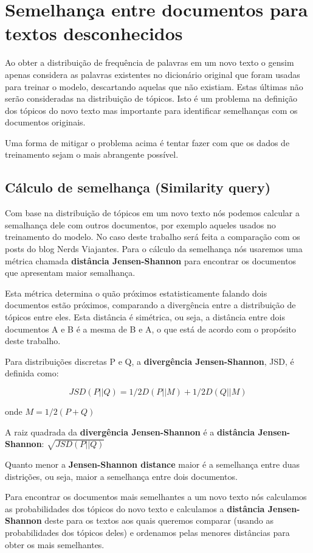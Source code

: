 \section{Semelhança entre documentos para textos desconhecidos}

Ao obter a distribuição de frequência de palavras em um novo texto o gensim apenas considera as palavras existentes no dicionário original que foram usadas para 
treinar o modelo, descartando aquelas que não existiam. Estas últimas não serão consideradas na distribuição de tópicos. Isto é um problema na definição dos tópicos
do novo texto mas importante para identificar semelhanças com os documentos originais.

Uma forma de mitigar o problema acima é tentar fazer com que os dados de treinamento sejam o mais abrangente possível.

\subsection{Cálculo de semelhança (Similarity query)}

Com base na distribuição de tópicos em um novo texto nós podemos calcular a semalhança dele com outros documentos, por exemplo aqueles usados no treinamento
do modelo. No caso deste trabalho será feita a comparação com os posts do blog Nerds Viajantes. Para o cálculo da semelhança nós usaremos uma métrica chamada
\textbf{distância Jensen-Shannon} para encontrar os documentos que apresentam maior semalhança.

Esta métrica determina o quão próximos estatisticamente falando dois documentos estão próximos, comparando a divergência entre a distribuição de tópicos
entre eles. Esta distância é simétrica, ou seja, a distância entre dois documentos A e B é a mesma de B e A, o que está de acordo com o propósito deste trabalho.

Para distribuições discretas P e Q, a \textbf{divergência Jensen-Shannon}, JSD, é definida como:

\[JSD(P||Q) = 1/2D(P||M) + 1/2D(Q||M)\]

onde \(M = 1/2(P + Q)\)

A raiz quadrada da \textbf{divergência Jensen-Shannon} é a \textbf{distância Jensen-Shannon}: \(\sqrt{JSD(P||Q)}\)

Quanto menor a \textbf{Jensen-Shannon distance} maior é a semelhança entre duas distrições, ou seja, maior a semelhança entre dois documentos.

Para encontrar os documentos mais semelhantes a um novo texto nós calculamos as probabilidades dos tópicos do novo texto e calculamos a 
\textbf{distância Jensen-Shannon} deste para os textos aos quais queremos comparar (usando as probabilidades dos tópicos deles) e ordenamos pelas 
menores distâncias para obter os mais semelhantes.